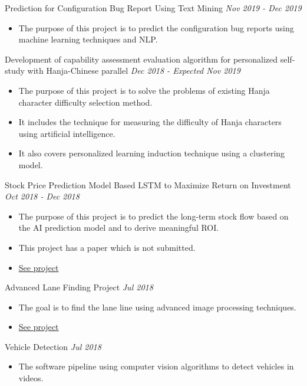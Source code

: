 \documentclass[10pt]{article}
\newenvironment{changemargin}[2]{
  \begin{list}{}{
    \setlength{\topsep}{0pt}
    \setlength{\leftmargin}{#1}
    \setlength{\rightmargin}{#2}
    \setlength{\listparindent}{\parindent}
    \setlength{\itemindent}{\parindent}
    \setlength{\parsep}{\parskip}
  }
  \item[]}{\end{list}
}
\newcommand{\project}[2]{
	{#1} \hfill \emph{#2}\\ \medskip
}
\newenvironment{body} {
	\vspace*{-16pt}
	\begin{changemargin}{-0.25in}{-0.5in}
  }
	{\end{changemargin}
}
\begin{document}
\begin{body}
	\vspace{14pt}
\project{Prediction for Configuration Bug Report Using Text Mining}{Nov 2019 - Dec 2019}
\begin{itemize} \itemsep -0pt  %
      \item  The purpose of this project is to predict the configuration bug reports using machine learning techniques and NLP.
  	\end{itemize}
\project{Development of capability assessment evaluation algorithm for personalized self-study with Hanja-Chinese parallel}{Dec 2018 - Expected Nov 2019}
\begin{itemize} \itemsep -0pt  %
      \item  The purpose of this project is to solve the problems of existing Hanja character difficulty selection method.
      \item It includes the technique for measuring the difficulty of Hanja characters using artificial intelligence.
      \item It also covers personalized learning induction technique using a clustering model.
  	\end{itemize}
\project{Stock Price Prediction Model Based LSTM to Maximize Return on Investment}{Oct 2018 - Dec 2018}
\begin{itemize} \itemsep -0pt  %
      \item  The purpose of this project is to predict the long-term stock flow based on the AI prediction model and to derive meaningful ROI.
      \item This project has a paper which is not submitted.
      \item \href{https://drive.google.com/file/d/1Fp3WmoBpHpYU13fNWS1vbQSzmBCR3MIu/view}{See project}
  	\end{itemize}
\project{Advanced Lane Finding Project}{Jul 2018}
\begin{itemize} \itemsep -0pt  %
      \item  The goal is to find the lane line using advanced image processing techniques.
      \item \href{https://github.com/jeongwhanchoi/CarND-Advanced-Lane-Lines}{See project}
  	\end{itemize}
\project{Vehicle Detection}{Jul 2018}
\begin{itemize} \itemsep -0pt  %
      \item  The software pipeline using computer vision algorithms to detect vehicles in videos.

\end{itemize}
\end{body}
\end{document}
